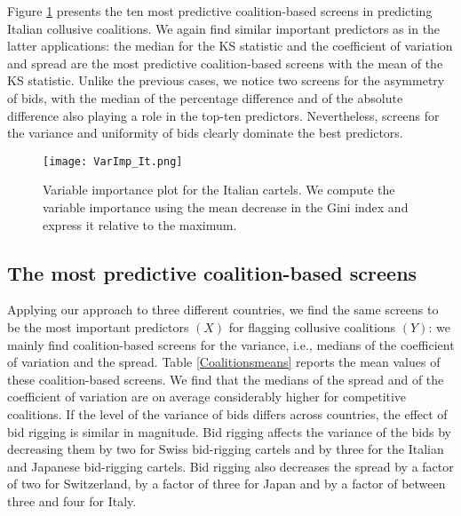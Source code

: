\documentclass[a4paper,11pt]{article}
\begin{document}
	Figure \ref{VarImp_It} presents the ten most predictive coalition-based screens in predicting Italian collusive coalitions. We again find similar important predictors as in the latter applications: the median for the KS statistic and the coefficient of variation and spread are the most predictive coalition-based screens with the mean of the KS statistic. Unlike the previous cases, we notice two screens for the asymmetry of bids, with the median of the percentage difference and of the absolute difference also playing a role in the top-ten predictors. Nevertheless, screens for the variance and uniformity of bids clearly dominate the best predictors.
	
	
	\begin{figure}[!htp]
		\centering \caption{\label{VarImp_It} Variable importance plot for the Italian cartels. We compute the variable importance using the mean decrease in the Gini index and express it relative to the maximum.}
		\texttt{[image: VarImp\_It.png]}
	\end{figure}
	
	\subsection{The most predictive coalition-based screens}
	
	Applying our approach to three different countries, we find the same screens to be the most important predictors $(X)$ for flagging collusive coalitions $(Y)$: we mainly find coalition-based screens for the variance, i.e., medians of the coefficient of variation and the spread. Table \ref{Coalitionsmeans} reports the mean values of these coalition-based screens. We find that the medians of the spread and of the coefficient of variation are on average considerably higher for competitive coalitions. If the level of the variance of bids differs across countries, the effect of bid rigging is similar in magnitude. Bid rigging affects the variance of the bids by decreasing them by two for Swiss bid-rigging cartels and by three for the Italian and Japanese bid-rigging cartels. Bid rigging also decreases the spread by a factor of two for Switzerland, by a factor of three for Japan and by a factor of between three and four for Italy. 
	
\end{document}
